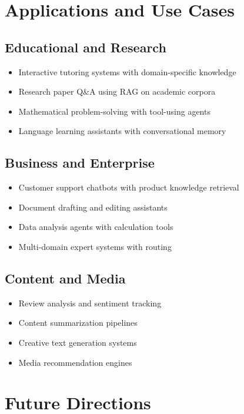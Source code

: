 \documentclass[12pt,a4paper]{article}
\begin{document}
\section{Applications and Use Cases}

\subsection{Educational and Research}

\begin{itemize}
    \item Interactive tutoring systems with domain-specific knowledge
    \item Research paper Q\&A using RAG on academic corpora
    \item Mathematical problem-solving with tool-using agents
    \item Language learning assistants with conversational memory
\end{itemize}

\subsection{Business and Enterprise}

\begin{itemize}
    \item Customer support chatbots with product knowledge retrieval
    \item Document drafting and editing assistants
    \item Data analysis agents with calculation tools
    \item Multi-domain expert systems with routing
\end{itemize}

\subsection{Content and Media}

\begin{itemize}
    \item Review analysis and sentiment tracking
    \item Content summarization pipelines
    \item Creative text generation systems
    \item Media recommendation engines
\end{itemize}

\section{Future Directions}
\end{document}
